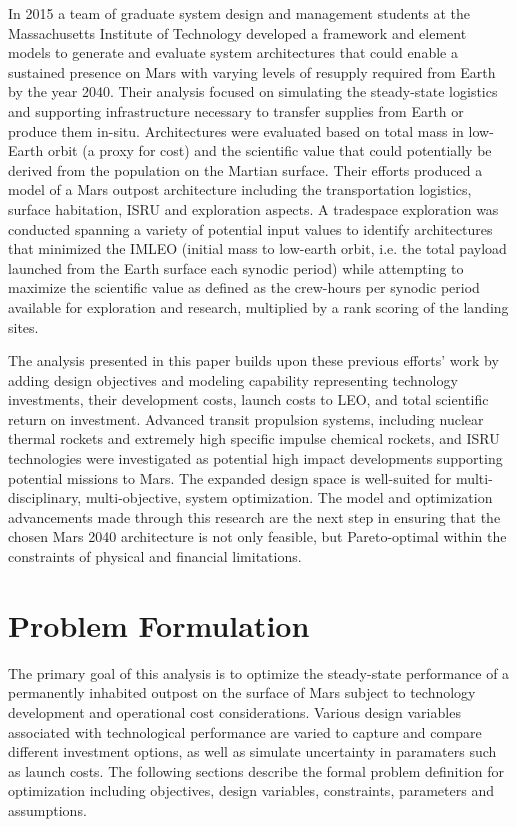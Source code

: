 \documentclass[]{aiaa-pretty}
\begin{document}
In 2015 a team of graduate system design and management students at the Massachusetts Institute of Technology developed a framework and element models to generate and evaluate system architectures that could enable a sustained presence on Mars with varying levels of resupply required from Earth by the year 2040. Their analysis focused on simulating the steady-state logistics and supporting infrastructure necessary to transfer supplies from Earth or produce them in-situ. Architectures were evaluated based on total mass in low-Earth orbit (a proxy for cost) and the scientific value that could potentially be derived from the population on the Martian surface. Their efforts produced a model of a Mars outpost architecture including the transportation logistics, surface habitation, ISRU and exploration aspects. A tradespace exploration was conducted spanning a variety of potential input values to identify architectures that minimized the IMLEO (initial mass to low-earth orbit, i.e. the total payload launched from the Earth surface each synodic period) while attempting to maximize the scientific value as defined as the crew-hours per synodic period available for exploration and research, multiplied by a rank scoring of the landing sites.

The analysis presented in this paper builds upon these previous efforts' work by adding design objectives and modeling capability representing technology investments, their development costs, launch costs to LEO, and total scientific return on investment. Advanced transit propulsion systems, including nuclear thermal rockets and extremely high specific impulse chemical rockets, and ISRU technologies were investigated as potential high impact developments supporting potential missions to Mars. The expanded design space is well-suited for multi-disciplinary, multi-objective, system optimization. The model and optimization advancements made through this research are the next step in ensuring that the chosen Mars 2040 architecture is not only feasible, but Pareto-optimal within the constraints of physical and financial limitations. 

\section{Problem Formulation}  
\label{sec:formulation}
The primary goal of this analysis is to optimize the steady-state performance of a permanently inhabited outpost on the surface of Mars subject to technology development and operational cost  considerations. Various design variables associated with technological performance are varied to capture and compare different investment options, as well as simulate uncertainty in paramaters such as launch costs. The following sections describe the formal problem definition for optimization including objectives, design variables, constraints, parameters and assumptions.
\end{document}
